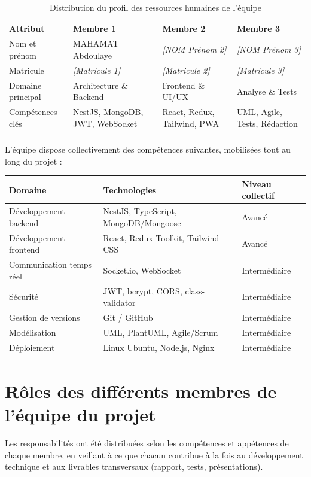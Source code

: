 \documentclass[12pt,a4paper,oneside]{report}
\begin{document}
\begin{longtable}{L{4cm}L{3.5cm}L{3.5cm}L{3.5cm}}
  \toprule
  \textbf{Attribut} & \textbf{Membre 1} & \textbf{Membre 2} & \textbf{Membre 3} \\
  \midrule
  Nom et prénom & MAHAMAT Abdoulaye & \textit{[NOM Prénom 2]} & \textit{[NOM Prénom 3]} \\
  Matricule & \textit{[Matricule 1]} & \textit{[Matricule 2]} & \textit{[Matricule 3]} \\
  Domaine principal & Architecture \& Backend & Frontend \& UI/UX & Analyse \& Tests \\
  Compétences clés & NestJS, MongoDB, JWT, WebSocket & React, Redux, Tailwind, PWA & UML, Agile, Tests, Rédaction \\
  \bottomrule
  \caption{Distribution du profil des ressources humaines de l'équipe}
\end{longtable}

L'équipe dispose collectivement des compétences suivantes, mobilisées tout au long du projet :

\begin{center}
\begin{tabular}{lll}
  \toprule
  \textbf{Domaine} & \textbf{Technologies} & \textbf{Niveau collectif} \\
  \midrule
  Développement backend & NestJS, TypeScript, MongoDB/Mongoose & Avancé \\
  Développement frontend & React, Redux Toolkit, Tailwind CSS & Avancé \\
  Communication temps réel & Socket.io, WebSocket & Intermédiaire \\
  Sécurité & JWT, bcrypt, CORS, class-validator & Intermédiaire \\
  Gestion de versions & Git / GitHub & Intermédiaire \\
  Modélisation & UML, PlantUML, Agile/Scrum & Intermédiaire \\
  Déploiement & Linux Ubuntu, Node.js, Nginx & Intermédiaire \\
  \bottomrule
\end{tabular}
\end{center}

\section{Rôles des différents membres de l'équipe du projet}

Les responsabilités ont été distribuées selon les compétences et appétences de chaque membre, en veillant à ce que chacun contribue à la fois au développement technique et aux livrables transversaux (rapport, tests, présentations).
\end{document}
